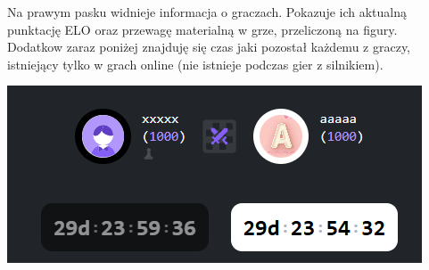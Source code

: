 \documentclass[12pt,a4paper]{article}
\begin{document}
\begin{minipage}[t]{0.45\textwidth} 
    \vspace{0pt} 
    \raggedright 
    Na prawym pasku widnieje informacja o graczach. Pokazuje ich aktualną punktację ELO oraz przewagę materialną w grze, przeliczoną na figury. Dodatkow zaraz poniżej znajduję się czas jaki pozostał każdemu z graczy, istniejący tylko w grach online (nie istnieje podczas gier z silnikiem).
\end{minipage} 
\hfill 
\begin{minipage}[t]{0.45\textwidth} 
    \vspace{0pt} 
    \centering 
    \includegraphics[width=\linewidth]{images/ins_min_players.png} 
\end{minipage}

\vspace{1cm}
\end{document}
